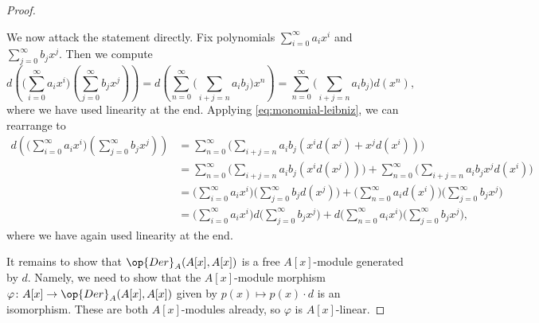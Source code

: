 \documentclass[../notes.tex]{subfiles}
\begin{document}
\begin{proof}
\begin{itemize}
		We now attack the statement directly. Fix polynomials $\sum_{i=0}^\infty a_ix^i$ and $\sum_{j=0}^\infty b_jx^j$. Then we compute
		\[d\left(\Bigg(\sum_{i=0}^\infty a_ix^i\Bigg)\left(\sum_{j=0}^\infty b_jx^j\right)\right) = d\left(\sum_{n=0}^\infty\Bigg(\sum_{i+j=n}a_ib_j\Bigg)x^n\right) = \sum_{n=0}^\infty\Bigg(\sum_{i+j=n}a_ib_j\Bigg)d\left(x^n\right),\]
		where we have used linearity at the end. Applying \autoref{eq:monomial-leibniz}, we can rearrange to
		\begin{align*}
			d\left(\Bigg(\sum_{i=0}^\infty a_ix^i\Bigg)\left(\sum_{j=0}^\infty b_jx^j\right)\right) &= \sum_{n=0}^\infty\Bigg(\sum_{i+j=n}a_ib_j\left(x^id\left(x^j\right)+x^jd\left(x^i\right)\right)\Bigg) \\
			&= \sum_{n=0}^\infty\Bigg(\sum_{i+j=n}a_ib_j\left(x^id\left(x^j\right)\right)\Bigg)+\sum_{n=0}^\infty\Bigg(\sum_{i+j=n}a_ib_jx^jd\left(x^i\right)\Bigg) \\
			&= \Bigg(\sum_{i=0}^\infty a_ix^i\Bigg)\Bigg(\sum_{j=0}^\infty b_jd\left(x^j\right)\Bigg)+\Bigg(\sum_{n=0}^\infty a_id\left(x^i\right)\Bigg)\Bigg(\sum_{j=0}^\infty b_jx^j\Bigg) \\
			&= \Bigg(\sum_{i=0}^\infty a_ix^i\Bigg)d\Bigg(\sum_{j=0}^\infty b_jx^j\Bigg)+d\Bigg(\sum_{n=0}^\infty a_ix^i\Bigg)\Bigg(\sum_{j=0}^\infty b_jx^j\Bigg),
		\end{align*}
		where we have again used linearity at the end.
	\end{itemize}
	It remains to show that $\op{Der}_A(A[x],A[x])$ is a free $A[x]$-module generated by $d$. Namely, we need to show that the $A[x]$-module morphism $\varphi\colon A[x]\to\op{Der}_A(A[x],A[x])$ given by $p(x)\mapsto p(x)\cdot d$ is an isomorphism. These are both $A[x]$-modules already, so $\varphi$ is $A[x]$-linear.


\end{proof}
\end{document}
